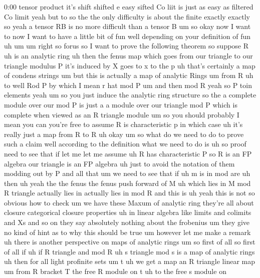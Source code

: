 \begin{unfinished}{0:00}
tensor  product
it's  shift  shifted  e  easy  sifted  Co  liit
is  just  as  easy  as  filtered  Co  limit
yeah  but  to  so  the  the  only  difficulty
is  about  the  finite  exactly  exactly  so
yeah  a  tensor  RB  is  no  more  difficult
than  a  tensor
B
um  so  okay  now  I  want  to  now  I  want  to
have  a  little  bit  of  fun  well  depending
on  your  definition  of  fun  uh
um
um
right  so
forus  so  I  want  to  prove  the  following
theorem  so  suppose  R  uh  is  an  analytic
ring  uh  then  the  fenus
map  which  goes  from  our  triangle  to  our
triangle  modulus  P  it's  induced  by  X
goes  to  x  to  the
p  uh  that's  certainly  a  map  of  condens
strings  um  but  this  is  actually  a  map  of
analytic
Rings  um  from  R  uh  to  well  Rod  P  by
which  I
mean  r  hat  mod  P
um  and
then  mod
R  yeah  so  P  toin  elements  yeah
um  so  you  just  induce  the  analytic  ring
structure  so  the  a  complete  module  over
our  mod  P  is  just  a  a  module  over  our
triangle  mod  P  which  is  complete  when
viewed  as  an  R  triangle
module
um  so  you  should  probably  I  mean  you  can
you're  free  to  assume  R  is
characteristic  p  in  which  case  uh  it's
really  just  a  map  from  R  to
R
uh
okay
um  so  what  do  we  need  to  do  to  prove
such  a
claim  well  according  to  the  definition
what  we  need  to  do  is  uh  so
proof  need  to
see  that  if  let  me  let  me  assume  uh  R
has  characteristic  P  so  R  is  an  FP
algebra  our  triangle  is  an  FP
algebra  uh  just  to  avoid  the  notation  of
them  modding  out  by  P  and  all  that  um  we
need  to  see  that  if  uh  m  is  in  mod
are  uh
then  uh  yeah  the  the
fenus  the  fenus  push  forward  of  M  uh
which  lies  in  M  mod  R  triangle  actually
lies
in  actually  lies  in  mod
R  and  this  is
uh  yeah  this  is  not  so  obvious  how  to
check  um  we  have  these  Maxum  of  analytic
ring  they're  all  about  closure
categorical  closure  properties  uh  in
linear  algebra  like  limits  and  colimits
and  Xs  and  so  on  they  say  absolutely
nothing  about  the
frobenius  um  they  give  no  kind  of  hint
as  to  why  this  should  be  true  um  however
let  me  make  a
remark  uh  there  is  another
perspective  on  maps  of  analytic  rings
um  so  first  of  all  so  first  of  all  if  uh
if  R  triangle  and  mod
R  uh  s
triangle  mod  s  is  a  map  of  analytic
rings
uh  then  for
all  light  profinite
sets  um
t  uh  we  get  a  map  an  R  triangle  linear
map  um  from  R  bracket  T  the  free  R
module  on  t  uh  to  the  free  s  module  on

\end{unfinished}
